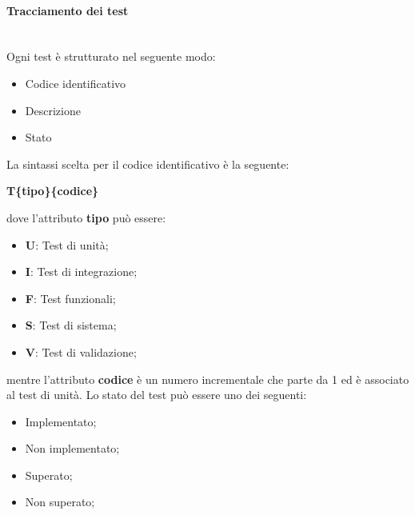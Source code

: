 \paragraph{Tracciamento dei test}\mbox{}\\[0.4cm]
Ogni test è strutturato nel seguente modo:
\begin{itemize}
	\item Codice identificativo
	\item Descrizione
	\item Stato
\end{itemize}
La sintassi scelta per il codice identificativo è la seguente:
\begin{center}
	\textbf{T\{tipo\}\{codice\}}
\end{center}
dove l'attributo \textbf{tipo} può essere:
\begin{itemize}
	\item \textbf{U}: Test di unità;
	\item \textbf{I}: Test di integrazione;
	\item \textbf{F}: Test funzionali;
	\item \textbf{S}: Test di sistema;
	\item \textbf{V}: Test di validazione;
\end{itemize}
mentre l'attributo \textbf{codice} è un numero incrementale che parte da 1 ed è associato al test di unità. Lo stato del test può essere uno dei seguenti:
\begin{itemize}
	\item Implementato;
	\item Non implementato;
	\item Superato;
	\item Non superato;
\end{itemize}
